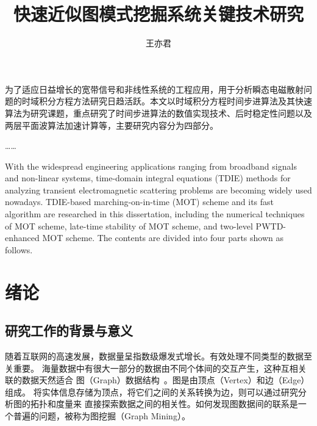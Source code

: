 \documentclass[master]{thesis-uestc}
\title{快速近似图模式挖掘系统关键技术研究}{A Research of technologies of 
fast approximate graph pattern mining system}
\author{王亦君}{Yijun Wang}
\begin{document}
\makecover

\begin{chineseabstract}
为了适应日益增长的宽带信号和非线性系统的工程应用，用于分析瞬态电磁散射问题的时域积分方程方法研究日趋活跃。本文以时域积分方程时间步进算法及其快速算法为研究课题，重点研究了时间步进算法的数值实现技术、后时稳定性问题以及两层平面波算法加速计算等，主要研究内容分为四部分。

……

\end{chineseabstract}

\begin{englishabstract}
With the widespread engineering applications ranging from broadband signals and non-linear systems, time-domain integral equations (TDIE) methods for analyzing transient electromagnetic scattering problems are becoming widely used nowadays. TDIE-based marching-on-in-time (MOT) scheme and its fast algorithm are researched in this dissertation, including the numerical techniques of MOT scheme, late-time stability of MOT scheme, and two-level PWTD-enhanced MOT scheme. The contents are divided into four parts shown as follows.

\end{englishabstract}

\thesistableofcontents

\chapter{绪\hspace{6pt}论}

\section{研究工作的背景与意义}

    随着互联网的高速发展，数据量呈指数级爆发式增长。有效处理不同类型的数据至关重要。
海量数据中有很大一部分的数据由不同个体间的交互产生，这种互相关联的数据天然适合
图（Graph）数据结构~\cite{NetworkScience}。图是由顶点（Vertex）和边（Edge）组成。
将实体信息存储为顶点，将它们之间的关系转换为边，则可以通过研究分析图的拓扑和度量来
直接探索数据之间的相关性。如何发现图数据间的联系是一个普遍的问题，被称为图挖掘（Graph Mining）。
\end{document}
